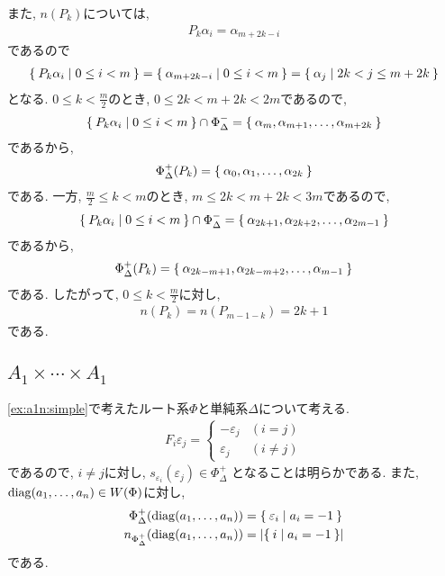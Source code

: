 また, $n(P_k)$については,
\begin{align*}
  P_k\alpha_i=\alpha_{m+2k-i}
\end{align*}
であるので
\begin{align*}
\Set{P_k\alpha_i|0\leq i < m}=\Set{\alpha_{m+2k-i}|0\leq i < m}=\Set{\alpha_{j}|2k <j\leq m+2k}
\end{align*}
となる.
$0\leq k <\frac{m}{2}$のとき, $0\leq 2k<m+2k<2m$であるので,
\begin{align*}
  \Set{P_k\alpha_i|0\leq i < m}\cap \Phi_\Delta^-=\Set{\alpha_{m},\alpha_{m+1},\ldots,\alpha_{m+2k}}
\end{align*}
であるから,
\begin{align*}
  \Phi_\Delta^+(P_k)=\Set{\alpha_{0},\alpha_{1},\ldots,\alpha_{2k}}
\end{align*}
である.
一方,
$\frac{m}{2}\leq k <m$のとき, $m\leq 2k<m+2k<3m$であるので,
\begin{align*}
  \Set{P_k\alpha_i|0\leq i < m}\cap \Phi_\Delta^-=\Set{\alpha_{2k+1},\alpha_{2k+2},\ldots,\alpha_{2m-1}}
\end{align*}
であるから,
\begin{align*}
  \Phi_\Delta^+(P_k)=\Set{\alpha_{2k-m+1},\alpha_{2k-m+2},\ldots,\alpha_{m-1}}
\end{align*}
である. 
したがって, $0\leq k <\frac{m}{2}$に対し,
\begin{align*}
 n(P_{k})=n(P_{m-1-k})=2k+1
\end{align*}
である.




\subsection{$A_{1}\times\cdots\times A_{1}$}
\label{ex:a1n:inversion}
\cref{ex:a1n:simple}で考えたルート系$\Phi$と単純系$\Delta$について考える.
\begin{align*}
  F_i\varepsilon_j=
  \begin{cases}
    -\varepsilon_j &(i=j)\\
    \varepsilon_j &(i\neq j)
  \end{cases}
\end{align*}
であるので,
$i\neq j$に対し,
$s_{\varepsilon_i}(\varepsilon_j)\in\Phi_\Delta^+$
となることは明らかである.
また, $\operatorname{diag}(a_1,\ldots,a_n)\in W(\Phi)$に対し,
\begin{align*}
  \Phi_\Delta^+(\operatorname{diag}(a_1,\ldots,a_n))&=\Set{\varepsilon_i|a_i=-1}\\
  n_{\Phi_\Delta^+}(\operatorname{diag}(a_1,\ldots,a_n))&=\left|\Set{i|a_i=-1}\right|
\end{align*}
である.

